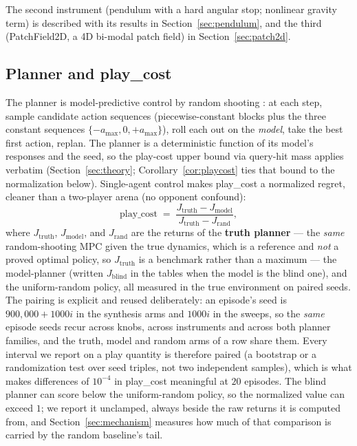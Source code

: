 \documentclass[11pt]{article}
\theoremstyle{definition}
\theoremstyle{remark}
\begin{document}
The second instrument (pendulum with a hard angular stop; nonlinear gravity term) is described with its results in Section~\ref{sec:pendulum}, and the third (PatchField2D, a 4D bi-modal patch field) in Section~\ref{sec:patch2d}.

\subsection{Planner and play\_cost}
\label{sec:planner}

The planner is model-predictive control by random shooting \citep{nagabandi2018neural,chua2018deep}: at each step, sample candidate action sequences (piecewise-constant blocks plus the three constant sequences $\{-a_{\max}, 0, +a_{\max}\}$), roll each out on the \emph{model}, take the best first action, replan. The planner is a deterministic function of its model's responses and the seed, so the play-cost upper bound via query-hit mass applies verbatim (Section~\ref{sec:theory}; Corollary~\ref{cor:playcost} ties that bound to the normalization below). Single-agent control makes play\_cost a normalized regret, cleaner than a two-player arena (no opponent confound):
\[
\mathrm{play\_cost} \;=\; \frac{J_{\mathrm{truth}} - J_{\mathrm{model}}}{J_{\mathrm{truth}} - J_{\mathrm{rand}}},
\]
where $J_{\mathrm{truth}}$, $J_{\mathrm{model}}$, and $J_{\mathrm{rand}}$ are the returns of the \textbf{truth planner} --- the \emph{same} random-shooting MPC given the true dynamics, which is a reference and \emph{not} a proved optimal policy, so $J_{\mathrm{truth}}$ is a benchmark rather than a maximum --- the model-planner (written $J_{\mathrm{blind}}$ in the tables when the model is the blind one), and the uniform-random policy, all measured in the true environment on paired seeds. The pairing is explicit and reused deliberately: an episode's seed is $900{,}000 + 1000i$ in the synthesis arms and $1000i$ in the sweeps, so the \emph{same} episode seeds recur across knobs, across instruments and across both planner families, and the truth, model and random arms of a row share them. Every interval we report on a play quantity is therefore paired (a bootstrap or a randomization test over seed triples, not two independent samples), which is what makes differences of $10^{-4}$ in play\_cost meaningful at $20$ episodes. The blind planner can score below the uniform-random policy, so the normalized value can exceed $1$; we report it unclamped, always beside the raw returns it is computed from, and Section~\ref{sec:mechanism} measures how much of that comparison is carried by the random baseline's tail.
\end{document}
